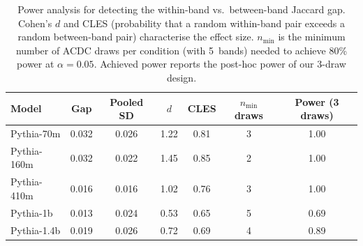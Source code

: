 \begin{table}[t]
\centering
\caption{Power analysis for detecting the within-band vs.\ between-band Jaccard gap.
Cohen's $d$ and CLES (probability that a random within-band pair exceeds a
random between-band pair) characterise the effect size.
$n_{\min}$ is the minimum number of ACDC draws per condition (with 5~bands)
needed to achieve 80\% power at $\alpha{=}0.05$.
Achieved power reports the post-hoc power of our 3-draw design.}
\label{tab:power_analysis}
\small
\begin{tabular}{lcccccc}
\toprule
Model & Gap & Pooled SD & $d$ & CLES & $n_{\min}$ draws & Power (3 draws) \\
\midrule
Pythia-70m & 0.032 & 0.026 & 1.22 & 0.81 & 3 & 1.00 \\
Pythia-160m & 0.032 & 0.022 & 1.45 & 0.85 & 2 & 1.00 \\
Pythia-410m & 0.016 & 0.016 & 1.02 & 0.76 & 3 & 1.00 \\
Pythia-1b & 0.013 & 0.024 & 0.53 & 0.65 & 5 & 0.69 \\
Pythia-1.4b & 0.019 & 0.026 & 0.72 & 0.69 & 4 & 0.89 \\
\bottomrule
\end{tabular}
\end{table}
